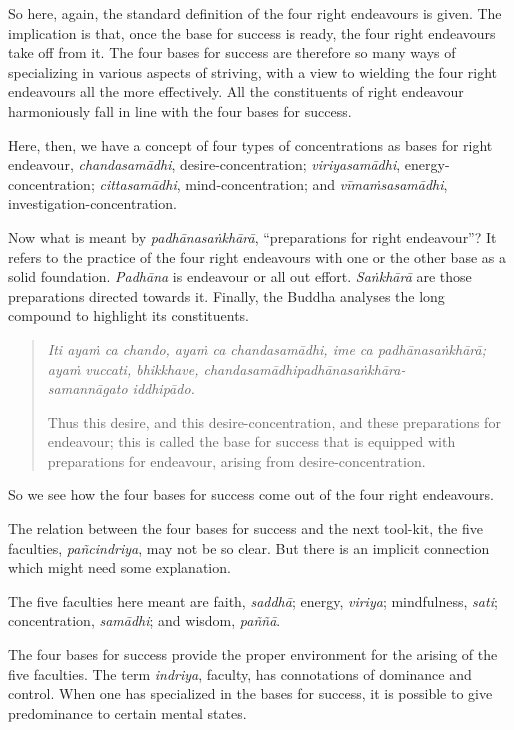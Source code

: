 So here, again, the standard definition of the four right endeavours is given. The implication is that, once the base for success is ready, the four right endeavours take off from it. The four bases for success are therefore so many ways of specializing in various aspects of striving, with a view to wielding the four right endeavours all the more effectively. All the constituents of right endeavour harmoniously fall in line with the four bases for success.

Here, then, we have a concept of four types of concentrations as bases for right endeavour, \emph{chandasamādhi}, desire-concentration; \emph{viriyasamādhi}, energy-concentration; \emph{cittasamādhi}, mind-concentration; and \emph{vīmaṁsasamādhi}, investigation-concentration.

Now what is meant by \emph{padhānasaṅkhārā}, ``preparations for right endeavour''? It refers to the practice of the four right endeavours with one or the other base as a solid foundation. \emph{Padhāna} is endeavour or all out effort. \emph{Saṅkhārā} are those preparations directed towards it. Finally, the Buddha analyses the long compound to highlight its constituents.

\begin{quote}
\emph{Iti ayaṁ ca chando, ayaṁ ca chandasamādhi, ime ca padhānasaṅkhārā; ayaṁ vuccati, bhikkhave, chandasamādhipadhānasaṅkhāra-\\ samannāgato iddhipādo.}

Thus this desire, and this desire-concentration, and these preparations for endeavour; this is called the base for success that is equipped with preparations for endeavour, arising from desire-concentration.
\end{quote}

So we see how the four bases for success come out of the four right endeavours.

The relation between the four bases for success and the next tool-kit, the five faculties, \emph{pañcindriya}, may not be so clear. But there is an implicit connection which might need some explanation.

The five faculties here meant are faith, \emph{saddhā}; energy, \emph{viriya}; mindfulness, \emph{sati}; concentration, \emph{samādhi}; and wisdom, \emph{paññā}.

The four bases for success provide the proper environment for the arising of the five faculties. The term \emph{indriya}, faculty, has connotations of dominance and control. When one has specialized in the bases for success, it is possible to give predominance to certain mental states.

